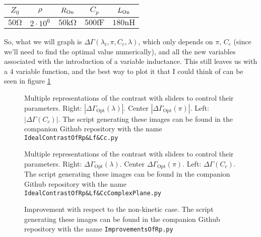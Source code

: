\documentclass[../main.tex]{subfiles}
\begin{document}
\begin{table}[H]
    \centering
    \begin{tabular}{c|c|c|c|c}
        \(Z_{0}\) & \(\rho\) & \(R_{\text{On}}\) & \(C_{p}\) & \(L_{\text{On}}\) \\\hline
        \(50\unit{\ohm}\) & \(2\cdot10^{6}\) & \(50\unit{\kilo\ohm}\) & \(500\unit{\femto\farad}\) & \(180\unit{\nano\henry}\)
    \end{tabular}
\end{table}

So, what we will graph is \(\Delta\Gamma(\lambda_{t}, \pi, C_{c}, \lambda)\),
which only depends on \(\pi\), \(C_{c}\) (since we'll need to find the optimal
value numerically), and all the new variables associated with the introduction
of a variable inductance. This still leaves us with a 4 variable function, and
the best way to plot it that I could think of can be seen in figure
\ref{fig:IdealContrast}

\begin{figure}[t]
\centering
  
  \caption{Multiple representations of the contrast with sliders to control
  their parameters. Right: \(|\Delta\Gamma_{\text{Opt}}(\lambda)|\).
  Center \(|\Delta\Gamma_{\text{Opt}}(\pi)|\). Left: \(|\Delta\Gamma(C_{c})|\).
  The script generating these images can be found in the companion Github
  repository with the name \texttt{IdealContrastOfRp\&Lf\&Cc.py}
}
\label{fig:IdealContrast}
\end{figure}

\begin{figure}[t]
\centering
  
  \caption{Multiple representations of the contrast with sliders to control
  their parameters. Right: \(\Delta\Gamma_{\text{Opt}}(\lambda)\).
  Center \(\Delta\Gamma_{\text{Opt}}(\pi)\). Left: \(\Delta\Gamma(C_{c})\).
  The script generating these images can be found in the companion Github
  repository with the name \texttt{IdealContrastOfRp\&Lf\&CcComplexPlane.py}
}
\label{fig:IdealComplexContrast}
\end{figure}

\begin{figure}[t]
\centering
  
  \caption{Improvement with respect to the non-kinetic case. The script generating these
  images can be found in the companion Github repository with the name \texttt{ImprovementsOfRp.py}}
\label{fig:KineticImprovement}
\end{figure}
\end{document}
